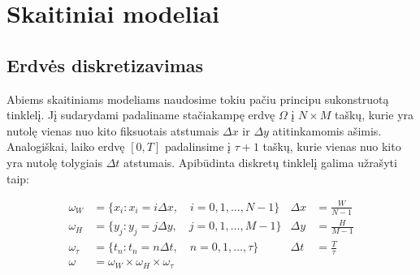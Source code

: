 \section{Skaitiniai modeliai}

\subsection{Erdvės diskretizavimas}

Abiems skaitiniams modeliams naudosime tokiu pačiu principu sukonstruotą tinklelį. Jį sudarydami padaliname stačiakampę erdvę $\Omega$ į $N\times M$ taškų, kurie yra nutolę vienas nuo kito fiksuotais atstumais $\Delta x$ ir $\Delta y$ atitinkamomis ašimis. Analogiškai, laiko erdvę $[0, T]$ padalinsime į $\tau + 1$ taškų, kurie vienas nuo kito yra nutolę tolygiais $\Delta t$ atstumais. Apibūdinta diskretų tinklelį galima užrašyti taip:

\begin{align}
    \omega_W&=\{ x_i : x_i = i\Delta x, \quad i=0, 1, \dots, N - 1 \} & \Delta x&=\frac{W}{N-1} \label{meshx}\\
    \omega_H&=\{ y_j : y_j = j\Delta y, \quad j=0, 1, \dots, M - 1 \} & \Delta y&=\frac{H}{M-1} \label{meshy}\\
    \omega_\tau&=\{ t_n : t_n = n\Delta t,\quad n=0, 1, \dots, \tau\} & \Delta t&=\frac{T}{\tau} \label{mesht}\\
	\omega&=\omega_W\times\omega_H\times\omega_\tau \label{mesh}
\end{align}

